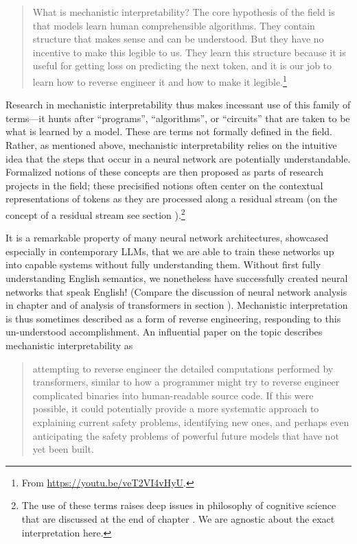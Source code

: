 \begin{quote}
What is mechanistic interpretability? The core hypothesis of the field is that
models learn human comprehensible algorithms. They contain structure that makes
sense and can be understood. But they have no incentive to make this legible to
us. They learn this structure because it is useful for getting loss on
predicting the next token, and it is our job to learn how to reverse engineer
it and how to make it legible.\footnote{From
\url{https://youtu.be/veT2VI4vHyU}.}
\end{quote}

Research in mechanistic interpretability thus makes incessant use of this
family of terms---it hunts after ``programs'', ``algorithms'', or ``circuits''
that are taken to be what is learned by a model. These are terms not formally
defined in the field. Rather, as mentioned above, mechanistic interpretability
relies on the intuitive idea that the steps that occur in a neural network are
potentially understandable. Formalized notions of these concepts are then
proposed as parts of research projects in the field; these precisified notions
often center on the contextual representations of tokens as they are processed
along a residual stream (on the concept of a residual stream see section
).\footnote{The use of these terms raises deep issues
in philosophy of cognitive science that are discussed at the end of chapter
.  We are agnostic about the exact interpretation
here.}

It is a remarkable property of many neural network architectures, showcased
especially in contemporary LLMs, that we are able to train these networks up
into capable systems without fully understanding them. Without first fully
understanding English semantics, we nonetheless have successfully created
neural networks that speak English! (Compare the discussion of neural network
analysis in chapter  and of analysis of transformers in
section ). Mechanistic interpretation is thus sometimes
described as a form of reverse engineering, responding to this un-understood
accomplishment. An influential paper on the topic describes mechanistic
interpretability as

\begin{quote}
attempting to reverse engineer the detailed computations performed by
transformers, similar to how a programmer might try to reverse engineer
complicated binaries into human-readable source code.  If this were possible,
it could potentially provide a more systematic approach to explaining current
safety problems, identifying new ones, and perhaps even anticipating the safety
problems of powerful future models that have not yet been
built.\cite{elhage2021mathematical} 
\end{quote}

